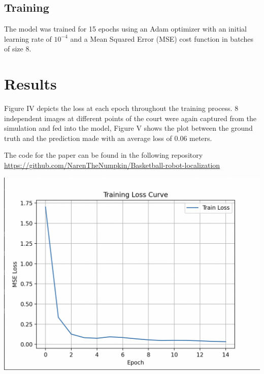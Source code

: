 \documentclass[a4paper]{article}
\begin{document}
\begin{multicols}{2}
\subsection{Training}
\par \noindent
The model was trained for 15 epochs using an Adam optimizer \cite{kingma2014adam} with an initial learning rate of $10^{-4}$
and a Mean Squared Error (MSE) cost function in batches of size 8. 

\section{Results}
\par \noindent
Figure IV depicts the loss at each epoch throughout the training process.
8 independent images at different points of the court were again captured 
from the simulation and fed into the model, Figure V shows the plot between
the ground truth and the prediction made with an average loss of 0.06 meters.

\par \noindent 
The code for the paper can be found in the following repository
\href{https://github.com/NarenTheNumpkin/Basketball-robot-localization}{https://github.com/NarenTheNumpkin/Basketball-robot-localization}

{ \centering
 \includegraphics[scale=0.3]{../results/loss-epochs.png}\\
 \label{pinki}
}


\end{multicols}
\end{document}
